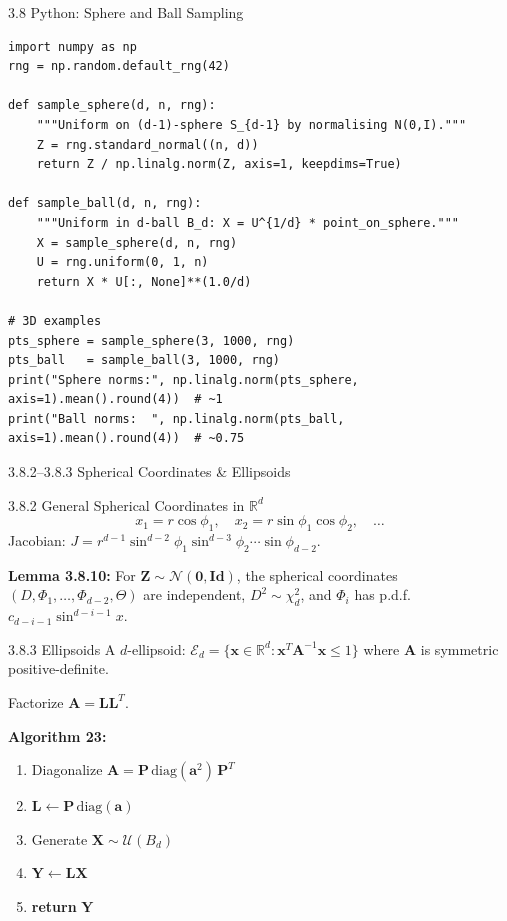 \documentclass[aspectratio=169,10pt]{beamer}
\newcommand{\RR}{\mathbb{R}}
\newcommand{\UU}{\mathcal{U}}
\newcommand{\NN}{\mathcal{N}}
\begin{document}
\begin{frame}[fragile]{3.8 Python: Sphere and Ball Sampling}
  \begin{lstlisting}[style=python, caption={Sample uniformly from sphere and ball in d dimensions}]
import numpy as np
rng = np.random.default_rng(42)

def sample_sphere(d, n, rng):
    """Uniform on (d-1)-sphere S_{d-1} by normalising N(0,I)."""
    Z = rng.standard_normal((n, d))
    return Z / np.linalg.norm(Z, axis=1, keepdims=True)

def sample_ball(d, n, rng):
    """Uniform in d-ball B_d: X = U^{1/d} * point_on_sphere."""
    X = sample_sphere(d, n, rng)
    U = rng.uniform(0, 1, n)
    return X * U[:, None]**(1.0/d)

# 3D examples
pts_sphere = sample_sphere(3, 1000, rng)
pts_ball   = sample_ball(3, 1000, rng)
print("Sphere norms:", np.linalg.norm(pts_sphere, axis=1).mean().round(4))  # ~1
print("Ball norms:  ", np.linalg.norm(pts_ball,   axis=1).mean().round(4))  # ~0.75
  \end{lstlisting}
\end{frame}

\begin{frame}[allowframebreaks]{3.8.2--3.8.3 Spherical Coordinates \& Ellipsoids}
  \begin{block}{3.8.2 General Spherical Coordinates in $\RR^d$}
    \[
      x_1 = r\cos\phi_1, \quad x_2 = r\sin\phi_1\cos\phi_2, \quad \ldots
    \]
    Jacobian: $J = r^{d-1}\sin^{d-2}\phi_1\sin^{d-3}\phi_2\cdots\sin\phi_{d-2}$.

    \medskip
    \textbf{Lemma 3.8.10:} For $\mathbf{Z}\sim\NN(\mathbf{0},\mathbf{Id})$, the
    spherical coordinates $(D,\Phi_1,\ldots,\Phi_{d-2},\Theta)$ are independent,
    $D^2\sim\chi^2_d$, and $\Phi_i$ has p.d.f.\ $c_{d-i-1}\sin^{d-i-1}x$.
  \end{block}

  \begin{block}{3.8.3 Ellipsoids}
    A $d$-ellipsoid: $\mathcal{E}_d = \{\mathbf{x}\in\RR^d : \mathbf{x}^T\mathbf{A}^{-1}\mathbf{x}\le 1\}$
    where $\mathbf{A}$ is symmetric positive-definite.

    \medskip
    Factorize $\mathbf{A} = \mathbf{L}\mathbf{L}^T$.

    \medskip
    \textbf{Algorithm 23:}
    \begin{enumerate}
      \item Diagonalize $\mathbf{A}=\mathbf{P}\,\mathrm{diag}(\mathbf{a}^2)\,\mathbf{P}^T$
      \item $\mathbf{L}\leftarrow\mathbf{P}\,\mathrm{diag}(\mathbf{a})$
      \item Generate $\mathbf{X}\sim\UU(B_d)$
      \item $\mathbf{Y}\leftarrow\mathbf{L}\mathbf{X}$
      \item \textbf{return} $\mathbf{Y}$
    \end{enumerate}
  \end{block}
\end{frame}
\end{document}
